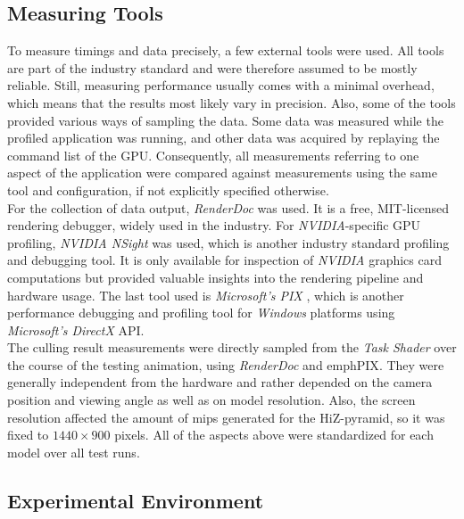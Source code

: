 \subsection*{Measuring Tools} \label{subsec-measuring-tools}

To measure timings and data precisely, a few external tools were used. All tools are part of the industry 
standard and were therefore assumed to be mostly reliable. Still, measuring performance usually comes with 
a minimal overhead, which means that the results most likely vary in precision. Also, some of the tools 
provided various ways of sampling the data. Some data was measured while the profiled application was 
running, and other data was acquired by replaying the command list of the \ac{GPU}. Consequently, all 
measurements referring to one aspect of the application were compared against measurements using the same 
tool and configuration, if not explicitly specified otherwise. \\

\noindent
For the collection of data output, \emph{RenderDoc} \cite{RenderDoc} was used. It is a free, MIT-licensed 
rendering debugger, widely used in the industry. For \emph{NVIDIA}-specific \ac{GPU} profiling, \emph{NVIDIA NSight} 
\cite{NSight} was used, which is another industry standard profiling and debugging tool. It is only available for 
inspection of \emph{NVIDIA} graphics card computations but provided valuable insights into the rendering pipeline 
and hardware usage. The last tool used is \emph{Microsoft's PIX} \cite{PIX}, which is another performance debugging 
and profiling tool for \emph{Windows} platforms using \emph{Microsoft's DirectX} \ac{API}. \\

\noindent
The culling result measurements were directly sampled from the \emph{Task Shader} over the course of the testing 
animation, using \emph{RenderDoc} and emph{PIX}. They were generally independent from the hardware and rather 
depended on the camera position and viewing angle as well as on model resolution. Also, the screen resolution 
affected the amount of mips generated for the \ac{HiZ}-pyramid, so it was fixed to $1440 \times 900$ pixels. 
All of the aspects above were standardized for each model over all test runs.


\subsection*{Experimental Environment} \label{subsec-experimental-environment}

